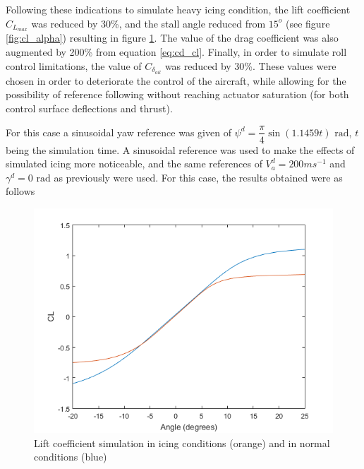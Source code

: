 Following these indications to simulate heavy icing condition, the lift coefficient $C_{L_{max}}$ was reduced by 30\%, and the stall angle reduced from $15^o$ (see figure \ref{fig:cl_alpha}) resulting in figure \ref{fig:cl_icing}. The value of the drag coefficient was also augmented by 200\% from equation \ref{eq:cd_cl}. Finally, in order to simulate roll control limitations, the value of $C_{\delta_{ail}}$ was reduced by 30\%. These values were chosen in order to deteriorate the control of the aircraft, while allowing for the possibility of reference following without reaching actuator saturation (for both control surface deflections and thrust). 

For this case a sinusoidal yaw reference was given of $\psi^d= \dfrac{\pi}{4} \sin (1.1459t)\text{ rad}$, $t$ being the simulation time. A sinusoidal reference was used to make the effects of simulated icing more noticeable, and the same references of $V_a^d=200ms^{-1}$ and $\gamma^d=0\text{ rad}$ as previously were used. For this case, the results obtained were as follows

\begin{figure}[H]
\centering
\includegraphics[width=1\textwidth]{Figures/Results/cl_icing.PNG}
\caption[Lift coefficient simulation in icing conditions]{Lift coefficient simulation in icing conditions (orange) and in normal conditions (blue)}
\label{fig:cl_icing}
\end{figure}

